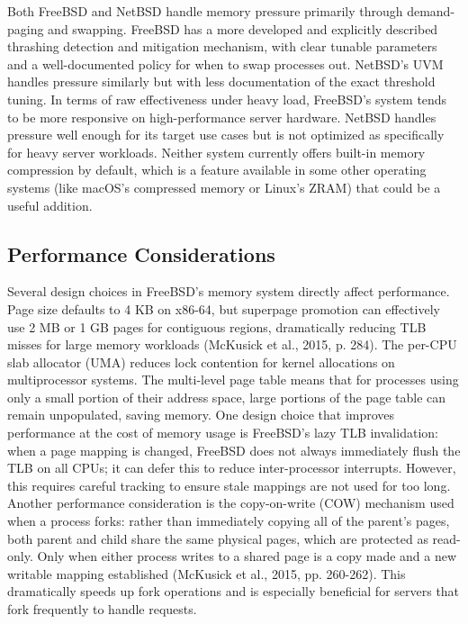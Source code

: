 Both FreeBSD and NetBSD handle memory pressure primarily through demand-paging and swapping. FreeBSD has a more developed and explicitly described thrashing detection and mitigation mechanism, with clear tunable parameters and a well-documented policy for when to swap processes out. NetBSD's UVM handles pressure similarly but with less documentation of the exact threshold tuning. In terms of raw effectiveness under heavy load, FreeBSD's system tends to be more responsive on high-performance server hardware. NetBSD handles pressure well enough for its target use cases but is not optimized as specifically for heavy server workloads. Neither system currently offers built-in memory compression by default, which is a feature available in some other operating systems (like macOS's compressed memory or Linux's ZRAM) that could be a useful addition.

\subsection{Performance Considerations}
Several design choices in FreeBSD's memory system directly affect performance. Page size defaults to 4 KB on x86-64, but superpage promotion can effectively use 2 MB or 1 GB pages for contiguous regions, dramatically reducing TLB misses for large memory workloads (McKusick et al., 2015, p. 284). The per-CPU slab allocator (UMA) reduces lock contention for kernel allocations on multiprocessor systems. The multi-level page table means that for processes using only a small portion of their address space, large portions of the page table can remain unpopulated, saving memory.
One design choice that improves performance at the cost of memory usage is FreeBSD's lazy TLB invalidation: when a page mapping is changed, FreeBSD does not always immediately flush the TLB on all CPUs; it can defer this to reduce inter-processor interrupts. However, this requires careful tracking to ensure stale mappings are not used for too long. Another performance consideration is the copy-on-write (COW) mechanism used when a process forks: rather than immediately copying all of the parent's pages, both parent and child share the same physical pages, which are protected as read-only. Only when either process writes to a shared page is a copy made and a new writable mapping established (McKusick et al., 2015, pp. 260-262). This dramatically speeds up fork operations and is especially beneficial for servers that fork frequently to handle requests.

